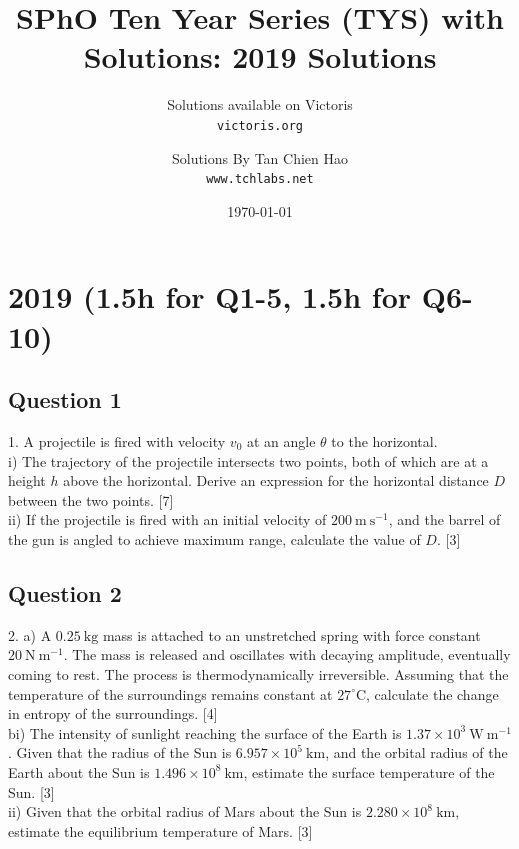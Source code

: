 \documentclass{article}
\title{SPhO Ten Year Series (TYS) with Solutions: 2019 Solutions}
\author{
    Solutions available on Victoris\\
    \texttt{victoris.org}
    \and 
    Solutions By Tan Chien Hao\\
    \texttt{www.tchlabs.net}
}
\date{\today}
\begin{document}
\maketitle

\section{2019 (1.5h for Q1-5, 1.5h for Q6-10)}
\subsection{Question 1}
1. A projectile is fired with velocity $v_{0}$ at an angle $\theta$ to the horizontal. \\
i) The trajectory of the projectile intersects two points, both of which are at a height $h$ above the horizontal. Derive an expression for the horizontal distance $D$ between the two points. [7]  \\
ii) If the projectile is fired with an initial velocity of $200 \mathrm{~m} \mathrm{~s}^{-1}$, and the barrel of the gun is angled to achieve maximum range, calculate the value of $D$. [3]

\subsection{Question 2}
2. a) A $0.25 \mathrm{~kg}$ mass is attached to an unstretched spring with force constant $20 \mathrm{~N} \mathrm{~m}^{-1}$. The mass is released and oscillates with decaying amplitude, eventually coming to rest. The process is thermodynamically irreversible. Assuming that the temperature of the surroundings remains constant at $27^{\circ} \mathrm{C}$, calculate the change in entropy of the surroundings. [4] \\
bi) The intensity of sunlight reaching the surface of the Earth is $1.37 \times 10^{3} \mathrm{~W} \mathrm{~m}^{-1}$. Given that the radius of the Sun is $6.957 \times 10^{5} \mathrm{~km}$, and the orbital radius of the Earth about the Sun is $1.496 \times 10^{8} \mathrm{~km}$, estimate the surface temperature of the Sun. [3] \\
ii) Given that the orbital radius of Mars about the Sun is $2.280 \times 10^{8} \mathrm{~km}$, estimate the equilibrium temperature of Mars. [3]
\end{document}
